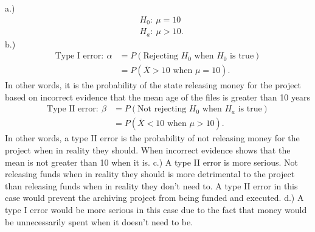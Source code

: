 \documentclass{report}
\begin{document}
\bigbreak \noindent 
a.)
\begin{align*}
    &H_{0}:\ \mu = 10 \\
    &H_{a}:\ \mu > 10
.\end{align*}
\bigbreak \noindent 
b.)
\begin{align*}
    \text{Type I error}:\ \alpha &= P(\text{Rejecting $H_{0}$ when $H_{0}$ is true})  \\
                                 &=P(\bar{X} > 10 \text{ when } \mu = 10)
.\end{align*}
In other words, it is the probability of the state releasing money for the project based on incorrect evidence that the mean age of the files is greater than 10 years
\bigbreak \noindent 
\begin{align*}
    \text{Type II error}:\ \beta &= P(\text{Not rejecting $H_{0}$ when $H_{a}$ is true})   \\
                                 &= P(\bar{X} < 10 \text{ when } \mu > 10)
.\end{align*}
In other words, a type II error is the probability of not releasing money for the project when in reality they should. When incorrect evidence shows that the mean is not greater than 10 when it is.
\bigbreak \noindent 
c.) A type II error is more serious. Not releasing funds when in reality they should is more detrimental to the project than releasing funds when in reality they don't need to. A type II error in this case would prevent the archiving project from being funded and executed.
\bigbreak \noindent 
d.) A type I error would be more serious in this case due to the fact that money would be unnecessarily spent when it doesn't need to be.
\end{document}
